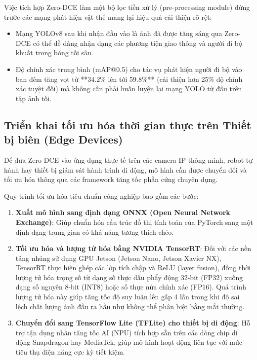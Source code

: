 \documentclass[a4paper]{article}
\begin{document}
Việc tích hợp Zero-DCE làm một bộ lọc tiền xử lý (pre-processing module) đứng trước các mạng phát hiện vật thể mang lại hiệu quả cải thiện rõ rệt:
\begin{itemize}
    \item Mạng YOLOv8 sau khi nhận đầu vào là ảnh đã được tăng sáng qua Zero-DCE có thể dễ dàng nhận dạng các phương tiện giao thông và người đi bộ khuất trong bóng tối sâu.
    \item Độ chính xác trung bình (mAP@0.5) cho tác vụ phát hiện người đi bộ vào ban đêm tăng vọt từ **34.2\% lên tới 59.8\%** (cải thiện hơn 25\% độ chính xác tuyệt đối) mà không cần phải huấn luyện lại mạng YOLO từ đầu trên tập ảnh tối.
\end{itemize}

\subsection{Triển khai tối ưu hóa thời gian thực trên Thiết bị biên (Edge Devices)}
Để đưa Zero-DCE vào ứng dụng thực tế trên các camera IP thông minh, robot tự hành hay thiết bị giám sát hành trình di động, mô hình cần được chuyển đổi và tối ưu hóa thông qua các framework tăng tốc phần cứng chuyên dụng.

Quy trình tối ưu hóa tiêu chuẩn công nghiệp bao gồm các bước:
\begin{enumerate}
    \item \textbf{Xuất mô hình sang định dạng ONNX (Open Neural Network Exchange)}: Giúp chuẩn hóa cấu trúc đồ thị tính toán của PyTorch sang một định dạng trung gian có khả năng tương thích chéo.
    \item \textbf{Tối ưu hóa và lượng tử hóa bằng NVIDIA TensorRT}: Đối với các nền tảng nhúng sử dụng GPU Jetson (Jetson Nano, Jetson Xavier NX), TensorRT thực hiện ghép các lớp tích chập và ReLU (layer fusion), đồng thời lượng tử hóa trọng số từ dạng số thực dấu phẩy động 32-bit (FP32) xuống dạng số nguyên 8-bit (INT8) hoặc số thực nửa chính xác (FP16). Quá trình lượng tử hóa này giúp tăng tốc độ suy luận lên gấp 4 lần trong khi độ sai lệch chất lượng ảnh đầu ra hầu như không thể phân biệt bằng mắt thường.
    \item \textbf{Chuyển đổi sang TensorFlow Lite (TFLite) cho thiết bị di động}: Hỗ trợ tận dụng nhân tăng tốc AI (NPU) tích hợp sẵn trên các dòng chip di động Snapdragon hay MediaTek, giúp mô hình hoạt động liên tục với mức tiêu thụ điện năng cực kỳ tiết kiệm.
\end{enumerate}
\end{document}
